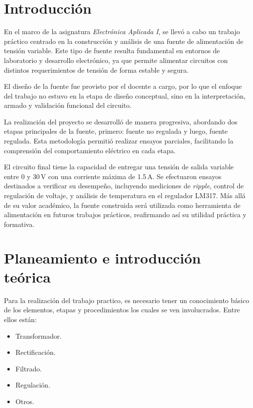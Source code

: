 \documentclass[chaptersright]{informeutn}
\begin{document}
  \maketitle

  \tableofcontents
  \setcounter{page}{1}
  \thispagestyle{plain}

  \chapter{Introducción}

    En el marco de la asignatura \textit{Electrónica Aplicada I}, se llevó a cabo un trabajo práctico centrado en la
    construcción y análisis de una fuente de alimentación de tensión variable. Este tipo de fuente resulta fundamental
    en entornos de laboratorio y desarrollo electrónico, ya que permite alimentar circuitos con distintos
    requerimientos de tensión de forma estable y segura.

    El diseño de la fuente fue provisto por el docente a cargo, por lo que el enfoque del trabajo no estuvo en la etapa
    de diseño conceptual, sino en la interpretación, armado y validación funcional del circuito.

    La realización del proyecto se desarrolló de manera progresiva, abordando dos etapas principales de la
    fuente, primero: fuente no regulada y luego, fuente regulada. Esta metodología permitió realizar ensayos parciales,
    facilitando la comprensión del comportamiento eléctrico en cada etapa.

    El circuito final tiene la capacidad de entregar una tensión de salida variable entre 0 y 30\,V con una corriente
    máxima de 1.5\,A. Se efectuaron ensayos destinados a verificar su desempeño, incluyendo mediciones de
    \textit{ripple}, control de regulación de voltaje, y análisis de temperatura en el regulador LM317. Más allá de su
    valor académico, la fuente construida será utilizada como herramienta de alimentación en futuros trabajos
    prácticos, reafirmando así su utilidad práctica y formativa.

  \chapter{Planeamiento e introducción teórica}
    Para la realización del trabajo practico, es necesario tener un conocimiento básico de los elementos, etapas y
    procedimientos los cuales se ven involucrados. Entre ellos están:
    \begin{itemize}
      \item Transformador.
      \item Rectificación.
      \item Filtrado.
      \item Regulación.
      \item Otros.
    \end{itemize}
\end{document}
